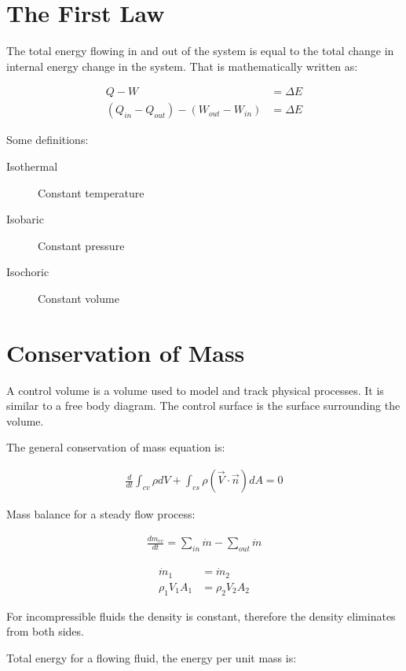 \section{The First Law}
The total energy flowing in and out of the system is equal to the total change in internal energy change in the system. That is mathematically written as:

\begin{align}
	Q-W&=\Delta E\\ 
	(Q_{in}-Q_{out}) - (W_{out}-W_{in}) &=\Delta E
\end{align}


Some definitions:

\begin{description}
	\item[Isothermal] Constant temperature
	\item[Isobaric] Constant pressure
	\item[Isochoric] Constant volume
\end{description}


\section{Conservation of Mass}

A control volume is a volume used to model and track physical processes. It is similar to a free body diagram. The control surface is the surface surrounding the volume.



The general conservation of mass equation is:

\begin{align}
\frac{d}{dt}\int_{cv} \rho dV
+
\int_{cs}\rho(\vec{V}\cdot\vec{n})dA
=
0
\end{align}

Mass balance for a steady flow process:

\begin{align}
\frac{dm_{cv}}{dt}
=
\sum_{in} \dot{m}
-
\sum_{out} \dot{m}
\end{align}

\begin{align}
\dot{m}_1      &= \dot{m}_2\\
\rho_1 V_1 A_1 &= \rho_2 V_2A_2
\end{align}

For incompressible fluids the density is constant, therefore the density eliminates from both sides.

Total energy for a flowing fluid, the energy per unit mass is:

